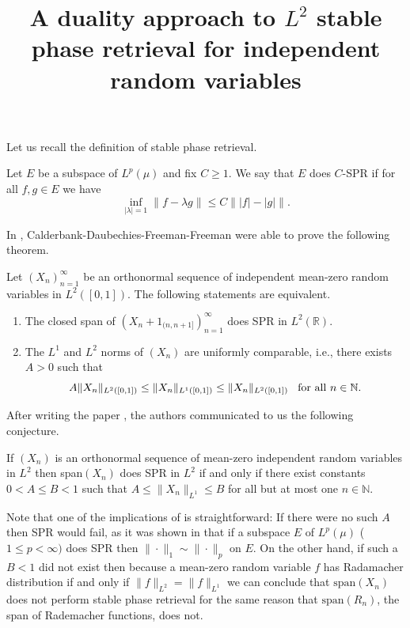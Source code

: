 \documentclass{inprogress}
\title{A duality approach to $L^2$ stable phase retrieval for independent random variables}
\begin{document}
\maketitle

Let us recall the definition of stable phase retrieval.
\begin{definition}
    Let $E$ be a subspace of $L^p(\mu)$ and fix $C\geq 1$. We say that $E$ does $C$-SPR if for all $f,g\in E$ we have
    \begin{equation}\label{C-SPR}
        \inf_{|\lambda|=1}\|f-\lambda g\|\leq C \| |f|-|g|\|.
    \end{equation}
\end{definition}


In \cite{calderbank2022stable},  Calderbank-Daubechies-Freeman-Freeman were able to prove the following theorem.

\begin{theorem}
 Let $(X_n)_{n=1}^\infty$ be an orthonormal sequence of independent mean-zero random variables in $L^2([0,1])$. The following statements are equivalent.
 \begin{enumerate}
\item The closed span of $(X_n+1_{(n,n+1]})_{n=1}^\infty$ does SPR in $L^2(\mathbb{R}).$
\item The $L^1$ and $L^2$ norms of $(X_n)$ are uniformly comparable, i.e., there exists $A>0$ such that $$A\|X_n\|_{L^2([0,1])}\leq \|X_n\|_{L^1([0,1])}\leq \|X_n\|_{L^2([0,1])}\hspace{3mm} \text{for all}\ n\in \mathbb{N}.$$
\end{enumerate}
\end{theorem}
After writing the paper \cite{calderbank2022stable}, the authors communicated to us the following conjecture.
\begin{conjecture}\label{conjecture CDFF}
    If $(X_n)$ is an orthonormal sequence of mean-zero independent random variables in $L^2$ then span$(X_n)$ does SPR in $L^2$ if and only if there exist constants $0<A\leq B<1$ such that $A\leq \|X_n\|_{L^1} \leq B$ for all but at most one $n\in \mathbb{N}$.
\end{conjecture}
Note that one of the implications of  is straightforward: If there were no such $A$ then SPR would fail, as it was shown in \cite{FOTP} that if a subspace $E$ of $L^p(\mu)$ ($1\leq p<\infty)$ does SPR then $\|\cdot\|_1\sim \|\cdot\|_p$ on $E$. On the other hand, if such a $B <1$ did not exist then because a mean-zero random variable $f$ has Radamacher distribution if and only if $\|f\|_{L^2}=\|f\|_{L^1}$ we can conclude that $\text{span} (X_n)$
does not perform stable phase retrieval for the same reason that $\text{span} (R_n)$, the span of Rademacher functions, does not.
\end{document}
